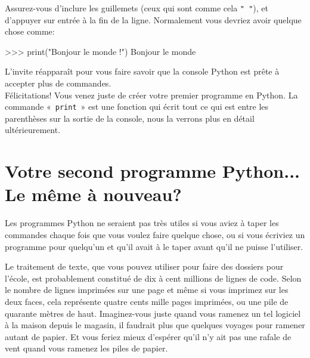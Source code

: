 Assurez-vous d'inclure les guillemets (ceux qui sont comme cela \texttt{" "}), et d'appuyer sur entrée à la fin de la ligne.
Normalement vous devriez avoir quelque chose comme:

\begin{Verbatim*}[frame=single,rulecolor=\color{mbleu}, label=à taper si cela n'est pas déjà fait]
>>> print("Bonjour le monde !")
Bonjour le monde
\end{Verbatim*}


L'invite réapparaît pour vous faire savoir que la console Python est prête à accepter plus de commandes.
\\


Félicitations! Vous venez juste de créer votre premier programme en Python. La commande « \verb+print+ » est une fonction qui écrit tout ce qui est entre les parenthèses sur la sortie de la console, nous la verrons plus en détail ultérieurement.

\section{Votre second programme Python... Le même à nouveau?}

Les programmes Python ne seraient pas très utiles si vous aviez à taper les commandes chaque fois que vous voulez faire quelque chose, ou si vous écriviez un programme pour quel\-qu'un et qu'il avait à le taper avant qu'il ne puisse l'utiliser.

Le traitement de texte, que vous pouvez utiliser pour faire des dossiers pour l'école, est probablement constitué de dix à cent millions de lignes de code. Selon le nombre de lignes imprimées sur une page et même si vous imprimez sur les deux faces, cela représente quatre cents mille pages imprimées, ou une pile de quarante mètres de haut. Imaginez-vous juste quand vous ramenez un tel logiciel à la maison depuis le magasin, il faudrait plus que quelques voyages pour ramener autant de papier. Et vous feriez mieux d'espérer qu'il n'y ait pas une rafale de vent quand vous ramenez les piles de papier.

